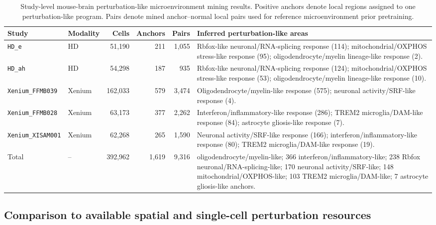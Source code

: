 \documentclass[sigconf,anonymous,review]{acmart}
\begin{document}
\begin{table}[t]
\centering
\caption{Study-level mouse-brain perturbation-like microenvironment mining results. Positive anchors denote local regions assigned to one perturbation-like program. Pairs denote mined anchor--normal local pairs used for reference microenvironment prior pretraining.}
\label{tab:mouse_mining_studies}
\scriptsize
\setlength{\tabcolsep}{3pt}
\renewcommand{\arraystretch}{1.10}
\begin{tabularx}{\textwidth}{@{}llrrr>{\raggedright\arraybackslash}X@{}}
\toprule
Study & Modality & Cells & Anchors & Pairs & Inferred perturbation-like areas \\
\midrule

\texttt{HD\_e} &
HD &
51,190 &
211 &
1,055 &
Rbfox-like neuronal/RNA-splicing response (114); mitochondrial/OXPHOS stress-like response (95); oligodendrocyte/myelin lineage-like response (2). \\

\texttt{HD\_ah} &
HD &
54,298 &
187 &
935 &
Rbfox-like neuronal/RNA-splicing response (124); mitochondrial/OXPHOS stress-like response (53); oligodendrocyte/myelin lineage-like response (10). \\

\texttt{Xenium\_FFMB039} &
Xenium &
162,033 &
579 &
3,474 &
Oligodendrocyte/myelin-like response (575); neuronal activity/SRF-like response (4). \\

\texttt{Xenium\_FFMB028} &
Xenium &
63,173 &
377 &
2,262 &
Interferon/inflammatory-like response (286); TREM2 microglia/DAM-like response (84); astrocyte gliosis-like response (7). \\

\texttt{Xenium\_XISAM001} &
Xenium &
62,268 &
265 &
1,590 &
Neuronal activity/SRF-like response (166); interferon/inflammatory-like response (80); TREM2 microglia/DAM-like response (19). \\

\midrule
Total &
-- &
392,962 &
1,619 &
9,316 &
587 oligodendrocyte/myelin-like; 366 interferon/inflammatory-like; 238 Rbfox neuronal/RNA-splicing-like; 170 neuronal activity/SRF-like; 148 mitochondrial/OXPHOS-like; 103 TREM2 microglia/DAM-like; 7 astrocyte gliosis-like anchors. \\

\bottomrule
\end{tabularx}
\end{table}

\subsection{Comparison to available spatial and single-cell perturbation resources}
\label{app:resource_comparison}
\end{document}

